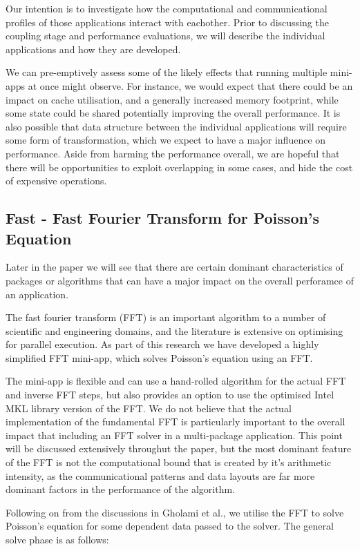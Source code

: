 \documentclass[runningheads,a4paper]{llncs}
\begin{document}
Our intention is to investigate how the computational and communicational profiles of those applications interact with eachother. Prior to discussing the coupling stage and performance evaluations, we will describe the individual applications and how they are developed.

We can pre-emptively assess some of the likely effects that running multiple mini-apps at once might observe. For instance, we would expect that there could be an impact on cache utilisation, and a generally increased memory footprint, while some state could be shared potentially improving the overall performance. It is also possible that data structure between the individual applications will require some form of transformation, which we expect to have a major influence on performance. Aside from harming the performance overall, we are hopeful that there will be opportunities to exploit overlapping in some cases, and hide the cost of expensive operations.

\subsection{Fast - Fast Fourier Transform for Poisson's Equation}

Later in the paper we will see that there are certain dominant characteristics of packages or algorithms that can have a major impact on the overall perforamce of an application. 

The fast fourier transform (FFT) is an important algorithm to a number of scientific and engineering domains, and the literature is extensive on optimising for parallel execution. As part of this research we have developed a highly simplified FFT mini-app, which solves Poisson's equation using an FFT.

The mini-app is flexible and can use a hand-rolled algorithm for the actual FFT and inverse FFT steps, but also provides an option to use the optimised Intel MKL library version of the FFT. We do not believe that the actual implementation of the fundamental FFT is particularly important to the overall impact that including an FFT solver in a multi-package application. This point will be discussed extensively throughut the paper, but the most dominant feature of the FFT is not the computational bound that is created by it's arithmetic intensity, as the communicational patterns and data layouts are far more dominant factors in the performance of the algorithm.

Following on from the discussions in Gholami et al., we utilise the FFT to solve Poisson's equation for some dependent data passed to the solver. The general solve phase is as follows:
\end{document}
